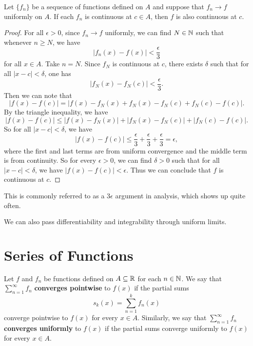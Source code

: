 \begin{theorem}
  Let $\{f_n\}$ be a sequence of functions defined
  on $A$ and suppose that $f_n \to f$ uniformly on $A$.
  If each $f_n$ is continuous at $c \in A$, then
  $f$ is also continuous at $c$.
\end{theorem}

\begin{proof}
  For all $\epsilon > 0$, since $f_n \to f$ uniformly,
  we can find $N \in \mathbb{N}$ such that whenever $n \ge N$,
  we have
  \[|f_n(x) - f(x)| < \frac{\epsilon}{3}\]
  for all $x \in A$. Take $n = N$. Since $f_N$ is continuous
  at $c$, there exists $\delta$ such that for all
  $|x - c| < \delta$, one has
  \[|f_N(x) - f_N(c)| < \frac{\epsilon}{3}.\]
  Then we can note that
  \[|f(x) - f(c)| = |f(x) - f_N(x) + f_N(x) - f_N(c) + f_N(c) - f(c)|.\]
  By the triangle inequality, we have
  \[|f(x) - f(c)| \le |f(x) - f_N(x)| + |f_N(x) - f_N(c)| + |f_N(c) - f(c)|.\]
  So for all $|x - c| < \delta$, we have
  \[|f(x) - f(c)| \le \frac{\epsilon}{3} + \frac{\epsilon}{3} + \frac{\epsilon}{3} = \epsilon,\]
  where the first and last terms are from uniform
  convergence and the middle term is from continuity.
  So for every $\epsilon > 0$, we can find $\delta > 0$
  such that for all $|x - c| < \delta$, we have
  $|f(x) - f(c)| < \epsilon$. Thus we can conclude that
  $f$ is continuous at $c$.
\end{proof}

\begin{remark}
  This is commonly referred to as a $3\epsilon$
  argument in analysis, which shows up quite often.
\end{remark}

\begin{remark}
  We can also pass differentiability and integrability
  through uniform limits.
\end{remark}

\section{Series of Functions}

\begin{definition}
  Let $f$ and $f_n$ be functions defined on $A \subseteq \mathbb{R}$
  for each $n \in \mathbb{N}$. We say that
  $\sum_{n = 1}^\infty f_n$ \textbf{converges pointwise}
  to $f(x)$ if the partial sums
  \[s_k(x) = \sum_{n = 1}^k f_n(x)\]
  converge pointwise to $f(x)$ for every $x \in A$.
  Similarly, we say that $\sum_{n = 1}^\infty f_n$
  \textbf{converges uniformly} to $f(x)$ if the partial sums
  converge uniformly to $f(x)$ for every $x \in A$.
\end{definition}

